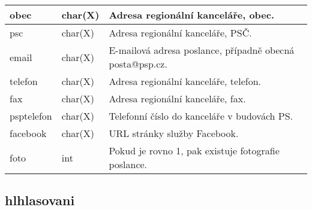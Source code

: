 \begin{center}
\begin{longtable}{|l|l|p{9cm}|}
		\hline 
		
		obec & char(X) & Adresa regionální kanceláře, obec. \\
		
		\hline 
		
		psc & char(X) & Adresa regionální kanceláře, PSČ. \\
		
		\hline 
		
		email & char(X) & E-mailová adresa poslance, případně obecná posta@psp.cz. \\
		
		\hline 
		
		telefon & char(X) & Adresa regionální kanceláře, telefon. \\
		
		\hline 
		
		fax & char(X) & Adresa regionální kanceláře, fax. \\
		
		\hline 
		
		psp\textunderscore telefon & char(X) & Telefonní číslo do kanceláře v budovách PS. \\
		
		\hline 
		
		facebook & char(X) & URL stránky služby Facebook. \\
		
		\hline 
		
		foto & int & Pokud je rovno 1, pak existuje fotografie poslance. \\
		
		\hline 
		
	\end{longtable}
\end{center}

\subsection{hl\textunderscore hlasovani}

